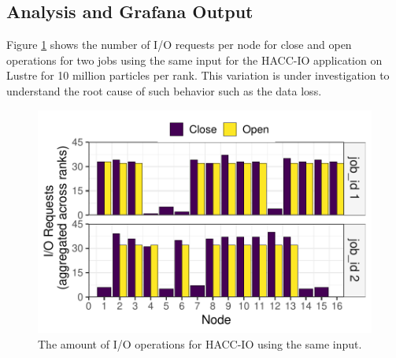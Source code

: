 \subsection{Analysis and Grafana Output}
Figure \ref{f:hacc2} shows the number of I/O requests per node for close and open operations for two jobs using the same input for the HACC-IO application on Lustre for 10 million particles per rank. This variation is under investigation to understand the root cause of such behavior such as the data loss.


\begin{figure}
	\centering
        \includegraphics[width=\linewidth]{figs/hacc_nfs_10.pdf}
	\caption{The amount of I/O operations for HACC-IO using the same input.}
	\label{f:hacc2}
\end{figure}


